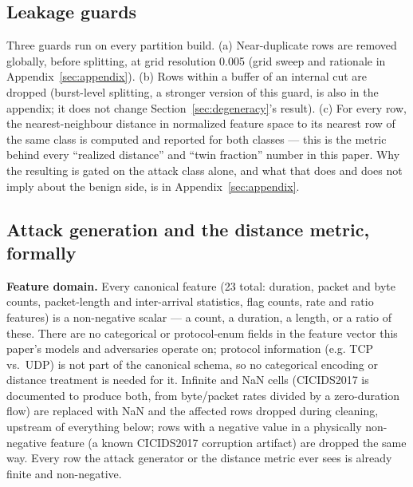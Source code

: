 \subsection{Leakage guards}
Three guards run on every partition build. (a) Near-duplicate rows are removed globally, before
splitting, at grid resolution 0.005 (grid sweep and rationale in
Appendix~\ref{sec:appendix}). (b) Rows within a buffer of an internal cut are dropped
(burst-level splitting, a stronger version of this guard, is also in the appendix; it does not
change Section~\ref{sec:degeneracy}'s result). (c) For every  row, the
nearest-neighbour distance in normalized feature space to its nearest 
row of the same class is computed and reported for both classes — this is the metric behind
every “realized distance” and “twin fraction” number in this paper.
Why the resulting  is gated on the attack class alone, and what that does
and does not imply about the benign side, is in Appendix~\ref{sec:appendix}.

\subsection{Attack generation and the distance metric, formally}
\textbf{Feature domain.} Every canonical feature (23 total: duration, packet and byte counts,
packet-length and inter-arrival statistics, flag counts, rate and ratio features) is a
non-negative scalar — a count, a duration, a length, or a ratio of these. There are no
categorical or protocol-enum fields in the feature vector this paper's models and adversaries
operate on; protocol information (e.g. TCP vs.\ UDP) is not part of the canonical schema, so no
categorical encoding or distance treatment is needed for it. Infinite and NaN cells (CICIDS2017
is documented to produce both, from byte/packet rates divided by a zero-duration flow) are
replaced with NaN and the affected rows dropped during cleaning, upstream of everything below;
rows with a negative value in a physically non-negative feature (a known CICIDS2017 corruption
artifact) are dropped the same way. Every row the attack generator or the distance metric ever
sees is already finite and non-negative.

